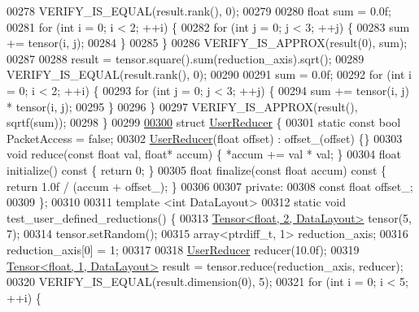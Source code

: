 \begin{DoxyCode}
00278   VERIFY\_IS\_EQUAL(result.rank(), 0);
00279 
00280   \textcolor{keywordtype}{float} sum = 0.0f;
00281   \textcolor{keywordflow}{for} (\textcolor{keywordtype}{int} i = 0; i < 2; ++i) \{
00282     \textcolor{keywordflow}{for} (\textcolor{keywordtype}{int} j = 0; j < 3; ++j) \{
00283       sum += tensor(i, j);
00284     \}
00285   \}
00286   VERIFY\_IS\_APPROX(result(0), sum);
00287 
00288   result = tensor.square().sum(reduction\_axis).sqrt();
00289   VERIFY\_IS\_EQUAL(result.rank(), 0);
00290 
00291   sum = 0.0f;
00292   \textcolor{keywordflow}{for} (\textcolor{keywordtype}{int} i = 0; i < 2; ++i) \{
00293     \textcolor{keywordflow}{for} (\textcolor{keywordtype}{int} j = 0; j < 3; ++j) \{
00294       sum += tensor(i, j) * tensor(i, j);
00295     \}
00296   \}
00297   VERIFY\_IS\_APPROX(result(), sqrtf(sum));
00298 \}
00299 
\hyperlink{struct_user_reducer}{00300} \textcolor{keyword}{struct }\hyperlink{struct_user_reducer}{UserReducer} \{
00301   \textcolor{keyword}{static} \textcolor{keyword}{const} \textcolor{keywordtype}{bool} PacketAccess = \textcolor{keyword}{false};
00302   \hyperlink{struct_user_reducer}{UserReducer}(\textcolor{keywordtype}{float} offset) : offset\_(offset) \{\}
00303   \textcolor{keywordtype}{void} reduce(\textcolor{keyword}{const} \textcolor{keywordtype}{float} val, \textcolor{keywordtype}{float}* accum) \{ *accum += val * val; \}
00304   \textcolor{keywordtype}{float} initialize()\textcolor{keyword}{ const }\{ \textcolor{keywordflow}{return} 0; \}
00305   \textcolor{keywordtype}{float} finalize(\textcolor{keyword}{const} \textcolor{keywordtype}{float} accum)\textcolor{keyword}{ const }\{ \textcolor{keywordflow}{return} 1.0f / (accum + offset\_); \}
00306 
00307  \textcolor{keyword}{private}:
00308   \textcolor{keyword}{const} \textcolor{keywordtype}{float} offset\_;
00309 \};
00310 
00311 \textcolor{keyword}{template} <\textcolor{keywordtype}{int} DataLayout>
00312 \textcolor{keyword}{static} \textcolor{keywordtype}{void} test\_user\_defined\_reductions() \{
00313   \hyperlink{class_eigen_1_1_tensor}{Tensor<float, 2, DataLayout>} tensor(5, 7);
00314   tensor.setRandom();
00315   array<ptrdiff\_t, 1> reduction\_axis;
00316   reduction\_axis[0] = 1;
00317 
00318   \hyperlink{struct_user_reducer}{UserReducer} reducer(10.0f);
00319   \hyperlink{class_eigen_1_1_tensor}{Tensor<float, 1, DataLayout>} result = tensor.reduce(reduction\_axis, reducer);
00320   VERIFY\_IS\_EQUAL(result.dimension(0), 5);
00321   \textcolor{keywordflow}{for} (\textcolor{keywordtype}{int} i = 0; i < 5; ++i) \{

\end{DoxyCode}
